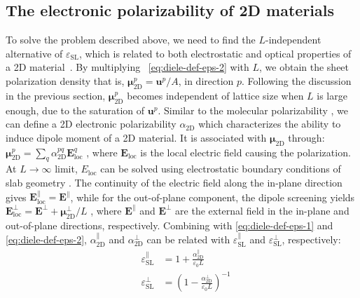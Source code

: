 \subsection{The electronic polarizability of 2D materials}
\label{sec:diel-electr-polar-2d}

To solve the problem described above, we need to find the
$L$-independent alternative of $\varepsilon_{\mathrm{SL}}$, which is
related to both electrostatic and optical properties of a 2D
material~\cite{Matthes_2016_effective_PRB}. By multiplying ~\autoref{eq:diele-def-eps-2}
with $L$, we obtain the sheet polarization density that is,
$\boldsymbol{\mu}_{\mathrm{2D}}^{p} =\boldsymbol{u}^{p}/A$, in
direction $p$. Following the discussion in the previous section,
$\boldsymbol{\mu}_{\mathrm{2D}}^{p}$ becomes independent of lattice
size when $L$ is large enough, due to the saturation of
$\boldsymbol{u}^{p}$.
%
Similar to the molecular polarizability \cite{Israelachvili_2011_book}, we
can define a 2D electronic polarizability $\alpha_{\mathrm{2D}}$ which
characterizes the ability to induce dipole moment of a 2D material. It
is associated with $\boldsymbol{\mu}_{\mathrm{2D}}$ through:
$\boldsymbol{\mu}_{\mathrm{2D}}^{p} = \sum_{q}
\alpha_{\mathrm{2D}}^{pq} \boldsymbol{E}_{\mathrm{loc}}^{q}$
\cite{Tobik_2004_perp_polariz}, where $\boldsymbol{E}_{\mathrm{loc}}$ is the local
electric field causing the polarization. At $L \rightarrow \infty$
limit, $E_{\mathrm{loc}}$ can be solved using electrostatic boundary
conditions of slab geometry \cite{Markel_2016_EMT}. The continuity of the
electric field along the in-plane direction gives
$\boldsymbol{E}^{\parallel}_{\mathrm{loc}}=\boldsymbol{E}^{\parallel}$,
while for the out-of-plane component, the dipole screening yields
$\boldsymbol{E}_{\mathrm{loc}}^{\perp}=\boldsymbol{E}^{\perp}+\boldsymbol{\mu}_{\mathrm{2D}}^{\perp}/L$
\cite{Meyer_2001_dipole_slab,Tobik_2004_perp_polariz}, where
$\boldsymbol{E}^{\parallel}$ and $\boldsymbol{E}^{\perp}$ are the
external field in the in-plane and out-of-plane directions,
respectively. Combining with  \autoref{eq:diele-def-eps-1} and
\autoref{eq:diele-def-eps-2},
$\alpha_{\mathrm{2D}}^{\parallel}$ and $\alpha_{\mathrm{2D}}^{\perp}$
can be related with $\varepsilon_{\mathrm{SL}}^{\parallel}$ and
$\varepsilon_{\mathrm{SL}}^{\perp}$, respectively:
%
%
\begin{subequations}
\begin{eqnarray}
  \label{eq:diele-alpha-para-def}
  &\varepsilon_{\mathrm{SL}}^{\parallel} &= 1 + \frac{\alpha_{\mathrm{2D}}^{\parallel}}{\varepsilon_{0}L}\\
  \label{eq:diele-alpha-perp-def}
  &\varepsilon_{\mathrm{SL}}^{\perp} &= \left(1 - {\displaystyle \frac{\alpha_{\mathrm{2D}}^{\perp}}{\varepsilon_{\mathrm{0}} L}} \right)^{-1}
\end{eqnarray}
\end{subequations}


